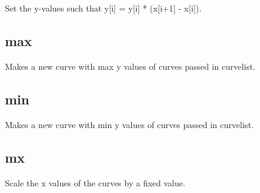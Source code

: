 \documentclass[letterpaper,10pt,english]{sphinxmanual}
\begin{document}
\subsection{}
\label{\detokenize{math_operations:makeextensive-2-4-2}}
Set the y-values such that y{[}i{]} = y{[}i{]} * (x{[}i+1{]} - x{[}i{]}). 

\begin{sphinxVerbatim}[commandchars=\\\{\}]
\PYG{p}{[}\PYG{p}{]}  
\end{sphinxVerbatim}


\subsection{max}
\label{\detokenize{math_operations:max}}
Makes a new curve with max y values of curves passed in curvelist.

\begin{sphinxVerbatim}[commandchars=\\\{\}]
\PYG{p}{[}\PYG{p}{]}  
\end{sphinxVerbatim}


\subsection{min}
\label{\detokenize{math_operations:min}}
Makes a new curve with min y values of curves passed in curvelist.

\begin{sphinxVerbatim}[commandchars=\\\{\}]
\PYG{p}{[}\PYG{p}{]}  
\end{sphinxVerbatim}


\subsection{mx}
\label{\detokenize{math_operations:mx}}
Scale the x values of the curves by a fixed value.

\begin{sphinxVerbatim}[commandchars=\\\{\}]
\PYG{p}{[}\PYG{p}{]}   
\end{sphinxVerbatim}
\end{document}

